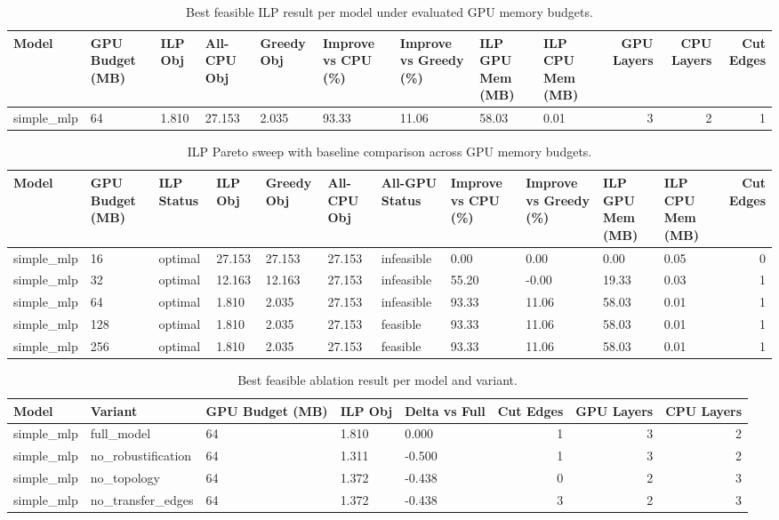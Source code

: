 \begin{table}[t]
\centering
\caption{Best feasible ILP result per model under evaluated GPU memory budgets.}
\label{tab:ilp-best-per-model}
\begin{tabular}{lllllllllrrr}
\toprule
Model & GPU Budget (MB) & ILP Obj & All-CPU Obj & Greedy Obj & Improve vs CPU (\%) & Improve vs Greedy (\%) & ILP GPU Mem (MB) & ILP CPU Mem (MB) & GPU Layers & CPU Layers & Cut Edges \\
\midrule
simple_mlp & 64 & 1.810 & 27.153 & 2.035 & 93.33 & 11.06 & 58.03 & 0.01 & 3 & 2 & 1 \\
\bottomrule
\end{tabular}

\end{table}

\begin{table}[t]
\centering
\caption{ILP Pareto sweep with baseline comparison across GPU memory budgets.}
\label{tab:ilp-budget-sweep}
\begin{tabular}{lllllllllllr}
\toprule
Model & GPU Budget (MB) & ILP Status & ILP Obj & Greedy Obj & All-CPU Obj & All-GPU Status & Improve vs CPU (\%) & Improve vs Greedy (\%) & ILP GPU Mem (MB) & ILP CPU Mem (MB) & Cut Edges \\
\midrule
simple_mlp & 16 & optimal & 27.153 & 27.153 & 27.153 & infeasible & 0.00 & 0.00 & 0.00 & 0.05 & 0 \\
simple_mlp & 32 & optimal & 12.163 & 12.163 & 27.153 & infeasible & 55.20 & -0.00 & 19.33 & 0.03 & 1 \\
simple_mlp & 64 & optimal & 1.810 & 2.035 & 27.153 & infeasible & 93.33 & 11.06 & 58.03 & 0.01 & 1 \\
simple_mlp & 128 & optimal & 1.810 & 2.035 & 27.153 & feasible & 93.33 & 11.06 & 58.03 & 0.01 & 1 \\
simple_mlp & 256 & optimal & 1.810 & 2.035 & 27.153 & feasible & 93.33 & 11.06 & 58.03 & 0.01 & 1 \\
\bottomrule
\end{tabular}

\end{table}

\begin{table}[t]
\centering
\caption{Best feasible ablation result per model and variant.}
\label{tab:ilp-ablation-best-per-variant}
\begin{tabular}{lllllrrr}
\toprule
Model & Variant & GPU Budget (MB) & ILP Obj & Delta vs Full & Cut Edges & GPU Layers & CPU Layers \\
\midrule
simple_mlp & full_model & 64 & 1.810 & 0.000 & 1 & 3 & 2 \\
simple_mlp & no_robustification & 64 & 1.311 & -0.500 & 1 & 3 & 2 \\
simple_mlp & no_topology & 64 & 1.372 & -0.438 & 0 & 2 & 3 \\
simple_mlp & no_transfer_edges & 64 & 1.372 & -0.438 & 3 & 2 & 3 \\
\bottomrule
\end{tabular}

\end{table}
